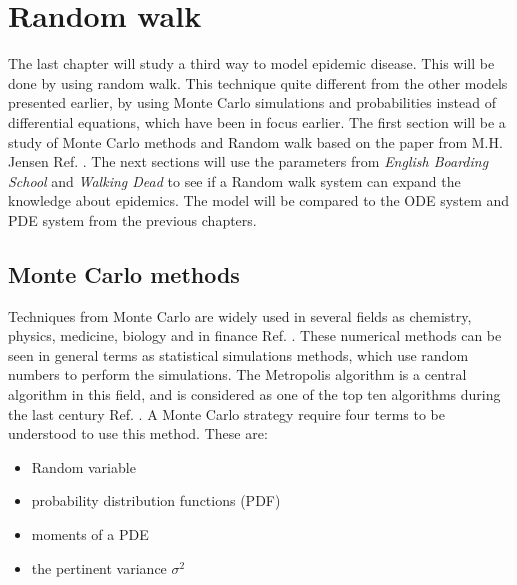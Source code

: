 \documentclass[%
twoside,                 %
final,                   %
chapterprefix=true,      %
open=right               %
10pt]{book}
\begin{document}
\chapter{Random walk}
The last chapter will study a third way to model epidemic disease. This will be done by using random walk. This technique quite different from the other models presented earlier, by using Monte Carlo simulations and probabilities instead of differential equations, which have been in focus earlier. The first section will be a study of Monte Carlo methods and Random walk based on the paper from M.H. Jensen Ref. \cite{hjorth2011computational}. The next sections will use the parameters from \emph{English Boarding School} and \emph{Walking Dead} to see if a Random walk system can expand the knowledge about epidemics. The model will be compared to the ODE system and PDE system from the previous chapters.   

\section{Monte Carlo methods}
Techniques from Monte Carlo are widely used in several fields as chemistry, physics, medicine, biology and in finance Ref. \cite{hjorth2011computational}. These numerical methods can be seen in general terms as statistical simulations methods, which use random numbers to perform the simulations. The Metropolis algorithm is a central algorithm in this field, and is considered as one of the top ten algorithms during the last century Ref. \cite{hjorth2011computational}. A Monte Carlo strategy require four terms to be understood to use this method. These are:
\begin{itemize}
\item Random variable

\item probability distribution functions (PDF)

\item moments of a PDE

\item the pertinent variance $\sigma ^2$
\end{itemize}

\noindent
\end{document}
